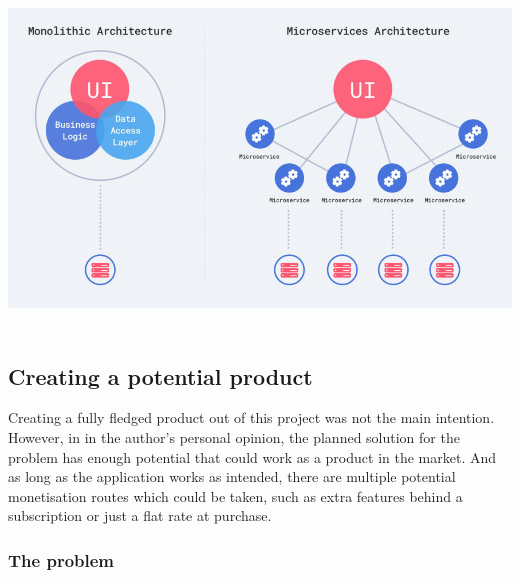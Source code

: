 \documentclass{article}
\newcommand{\vspaceconst}{-2ex}
\begin{document}
\begin{multicols}{2}
\begingroup
\centering
\includegraphics[width=0.9\linewidth]{./miscAssets/monoVsMicro.jpg}
~\label{fig:monoVsMicro}
\endgroup

\subsection{Creating a potential product}
\vspace{\vspaceconst}

Creating a fully fledged product out of this project was not the main intention. However, in in the author's personal opinion, the planned solution for the problem has enough potential that could work as a product in the market. And as long as the application works as intended, there are multiple potential monetisation routes which could be taken, such as extra features behind a subscription or just a flat rate at purchase.\\

\subsubsection{The problem}
\vspace{\vspaceconst}


\end{multicols}
\end{document}
